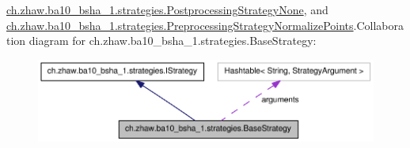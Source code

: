 \hyperlink{classch_1_1zhaw_1_1ba10__bsha__1_1_1strategies_1_1PostprocessingStrategyNone}{ch.zhaw.ba10\_\-bsha\_\-1.strategies.PostprocessingStrategyNone}, and \hyperlink{classch_1_1zhaw_1_1ba10__bsha__1_1_1strategies_1_1PreprocessingStrategyNormalizePoints}{ch.zhaw.ba10\_\-bsha\_\-1.strategies.PreprocessingStrategyNormalizePoints}.Collaboration diagram for ch.zhaw.ba10\_\-bsha\_\-1.strategies.BaseStrategy:\nopagebreak
\begin{figure}[H]
\begin{center}
\leavevmode
\includegraphics[width=400pt]{classch_1_1zhaw_1_1ba10__bsha__1_1_1strategies_1_1BaseStrategy__coll__graph}
\end{center}
\end{figure}
